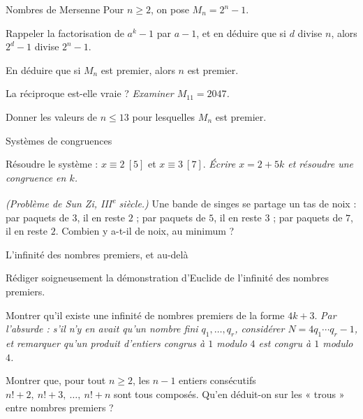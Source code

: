 \begin{exercice}[2]{Nombres de Mersenne}
Pour $n\geq2$, on pose $M_n=2^{n}-1$.
\begin{questions}
  \item Rappeler la factorisation de $a^{k}-1$ par $a-1$, et en déduire que
    si $d$ divise $n$, alors $2^{d}-1$ divise $2^{n}-1$.
  \item En déduire que si $M_n$ est premier, alors $n$ est premier.
  \item La réciproque est-elle vraie ? \emph{Examiner $M_{11}=2047$.}
  \item Donner les valeurs de $n\leq13$ pour lesquelles $M_n$ est premier.
\end{questions}
\end{exercice}

\begin{exercice}[2]{Systèmes de congruences}
\begin{questions}
  \item Résoudre le système : $x\equiv2\ [5]$ et $x\equiv3\ [7]$.
    \emph{Écrire $x=2+5k$ et résoudre une congruence en $k$.}
  \item \emph{(Problème de Sun Zi, {\upshape III}\textsuperscript{e} siècle.)}
    Une bande de singes se partage un tas de noix : par paquets de $3$, il
    en reste $2$ ; par paquets de $5$, il en reste $3$ ; par paquets de
    $7$, il en reste $2$. Combien y a-t-il de noix, au minimum ?
\end{questions}
\end{exercice}


\begin{exercice}[3]{L'infinité des nombres premiers, et au-delà}
\begin{questions}
  \item Rédiger soigneusement la démonstration d'Euclide de l'infinité des
    nombres premiers.
  \item Montrer qu'il existe une infinité de nombres premiers de la forme
    $4k+3$. \emph{Par l'absurde : s'il n'y en avait qu'un nombre fini
    $q_1,\dots,q_r$, considérer $N=4q_1\cdots q_r-1$, et remarquer qu'un
    produit d'entiers congrus à $1$ modulo $4$ est congru à $1$ modulo $4$.}
  \item Montrer que, pour tout $n\geq2$, les $n-1$ entiers consécutifs
    $n!+2,\ n!+3,\ \dots,\ n!+n$ sont tous composés. Qu'en déduit-on sur
    les « trous » entre nombres premiers ?
\end{questions}
\end{exercice}


